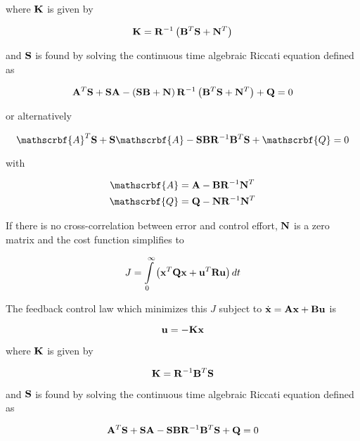 where $\mathbf{K}$ is given by

\begin{equation*}
  \mathbf{K} = \mathbf{R}^{-1} \left(\mathbf{B}^T\mathbf{S} + \mathbf{N}^T\right)
\end{equation*}

and $\mathbf{S}$ is found by solving the continuous time algebraic Riccati equation
defined as

\begin{equation*}
  \mathbf{A}^T\mathbf{S} + \mathbf{S}\mathbf{A} - \left(\mathbf{S}\mathbf{B} +
    \mathbf{N}\right) \mathbf{R}^{-1} \left(\mathbf{B}^T\mathbf{S} + \mathbf{N}^T\right) +
    \mathbf{Q} = 0
\end{equation*}

or alternatively

\begin{equation*}
  \mathscrbf{A}^T\mtx{S} + \mtx{S}\mathscrbf{A} -
    \mtx{S}\mtx{B}\mtx{R}^{-1}\mtx{B}^T\mtx{S} + \mathscrbf{Q} = 0
\end{equation*}

with

\begin{align*}
  \mathscrbf{A} &= \mtx{A} - \mtx{B}\mtx{R}^{-1}\mtx{N}^T \\
  \mathscrbf{Q} &= \mtx{Q} - \mtx{N}\mtx{R}^{-1}\mtx{N}^T
\end{align*}

If there is no cross-correlation between \gls{error} and \gls{control effort},
$\mathbf{N}$ is a zero matrix and the cost function simplifies to

\begin{equation*}
  J = \int\limits_0^\infty
    \left(\mathbf{x}^T\mathbf{Q}\mathbf{x} + \mathbf{u}^T\mathbf{R}\mathbf{u}\right) dt
\end{equation*}

The feedback \gls{control law} which minimizes this $J$ subject to
$\dot{\mathbf{x}} = \mathbf{A}\mathbf{x} + \mathbf{B}\mathbf{u}$ is

\begin{equation*}
  \mathbf{u} = -\mathbf{K}\mathbf{x}
\end{equation*}

where $\mathbf{K}$ is given by

\begin{equation*}
  \mathbf{K} = \mathbf{R}^{-1}\mathbf{B}^T\mathbf{S}
\end{equation*}

and $\mathbf{S}$ is found by solving the continuous time algebraic Riccati equation
defined as

\begin{equation*}
  \mathbf{A}^T\mathbf{S} + \mathbf{S}\mathbf{A} -
    \mathbf{S}\mathbf{B}\mathbf{R}^{-1}\mathbf{B}^T\mathbf{S} + \mathbf{Q} = 0
\end{equation*}

